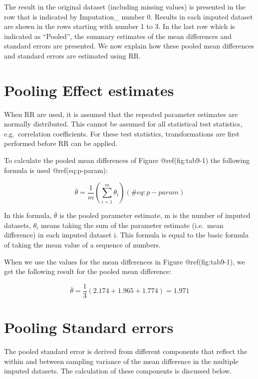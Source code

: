 \documentclass[
]{book}
\begin{document}
The result in the original dataset (including missing values) is
presented in the row that is indicated by Imputation\_ number 0. Results
in each imputed dataset are shown in the rows starting with number 1 to
3. In the last row which is indicated as ``Pooled'', the summary
estimates of the mean differences and standard errors are presented. We
now explain how these pooled mean differences and standard errors are
estimated using RR.

\hypertarget{pooling-effect-estimates}{%
\section{Pooling Effect estimates}\label{pooling-effect-estimates}}

When RR are used, it is assumed that the repeated parameter estimates
are normally distributed. This cannot be assumed for all statistical
test statistics, e.g.~correlation coefficients. For these test
statistics, transformations are first performed before RR can be
applied.

To calculate the pooled mean differences of Figure @ref(fig:tab9-1) the
following formula is used @ref(eq:p-param):

\begin{equation}
  \bar{\theta} = \frac{1}{m}\left (\sum_{i=1}^m{\theta_i}\right )
  (\#eq:p-param)
\end{equation}

In this formula, \(\bar{\theta}\) is the pooled parameter estimate, m is
the number of imputed datasets, \(\theta_i\) means taking the sum of the
parameter estimate (i.e.~mean difference) in each imputed dataset i.
This formula is equal to the basic formula of taking the mean value of a
sequence of numbers.

When we use the values for the mean differences in Figure
@ref(fig:tab9-1), we get the following result for the pooled mean
difference:

\[\bar{\theta} = \frac{1}{3}(2.174 + 1.965+1.774)=1.971\]

\hypertarget{pooling-standard-errors}{%
\section{Pooling Standard errors}\label{pooling-standard-errors}}

The pooled standard error is derived from different components that
reflect the within and between sampling variance of the mean difference
in the multiple imputed datasets. The calculation of these components is
discussed below.
\end{document}
